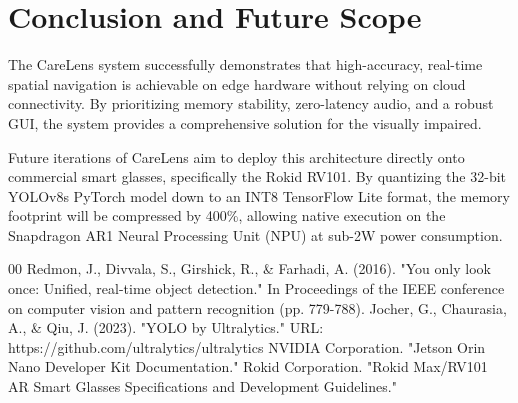 \documentclass[12pt,onecolumn]{IEEEtran}
\begin{document}
\section{Conclusion and Future Scope}
The CareLens system successfully demonstrates that high-accuracy, real-time spatial navigation is achievable on edge hardware without relying on cloud connectivity. By prioritizing memory stability, zero-latency audio, and a robust GUI, the system provides a comprehensive solution for the visually impaired.

Future iterations of CareLens aim to deploy this architecture directly onto commercial smart glasses, specifically the Rokid RV101. By quantizing the 32-bit YOLOv8s PyTorch model down to an INT8 TensorFlow Lite format, the memory footprint will be compressed by 400\%, allowing native execution on the Snapdragon AR1 Neural Processing Unit (NPU) at sub-2W power consumption.

\begin{thebibliography}{00}
 Redmon, J., Divvala, S., Girshick, R., \& Farhadi, A. (2016). "You only look once: Unified, real-time object detection." In Proceedings of the IEEE conference on computer vision and pattern recognition (pp. 779-788).
 Jocher, G., Chaurasia, A., \& Qiu, J. (2023). "YOLO by Ultralytics." URL: https://github.com/ultralytics/ultralytics
 NVIDIA Corporation. "Jetson Orin Nano Developer Kit Documentation."
 Rokid Corporation. "Rokid Max/RV101 AR Smart Glasses Specifications and Development Guidelines."
\end{thebibliography}
\end{document}
